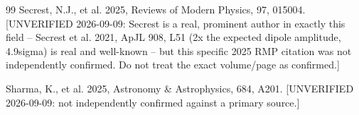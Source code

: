 \documentclass[11pt,a4paper,twocolumn]{article}
\begin{document}
\begin{thebibliography}{99}
 Secrest, N.J., et al. 2025, Reviews of Modern Physics, 97, 015004. [UNVERIFIED 2026-09-09: Secrest is a real, prominent author in exactly this field -- Secrest et al. 2021, ApJL 908, L51 (2x the expected dipole amplitude, 4.9sigma) is real and well-known -- but this specific 2025 RMP citation was not independently confirmed. Do not treat the exact volume/page as confirmed.]

 Sharma, K., et al. 2025, Astronomy \& Astrophysics, 684, A201. [UNVERIFIED 2026-09-09: not independently confirmed against a primary source.]

\end{thebibliography}
\end{document}
